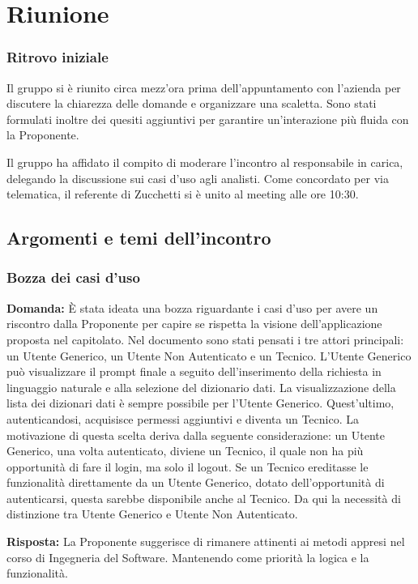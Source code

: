 \section{Riunione}
\subsubsection{Ritrovo iniziale}
Il gruppo si è riunito circa mezz’ora prima dell’appuntamento con l’azienda per discutere la chiarezza delle domande e organizzare una scaletta. Sono stati formulati inoltre dei quesiti aggiuntivi per garantire un’interazione più fluida con la Proponente.

Il gruppo ha affidato il compito di moderare l’incontro al responsabile in carica, delegando la discussione sui casi d’uso agli analisti. Come concordato per via telematica, il referente di Zucchetti si è unito al meeting alle ore 10:30.

\subsection{Argomenti e temi dell'incontro}


\subsubsection{Bozza dei casi d'uso}

\textbf{Domanda:} È stata ideata una bozza riguardante i casi d'uso per avere un riscontro dalla Proponente per capire se rispetta la visione dell’applicazione proposta nel capitolato.
Nel documento sono stati pensati i tre attori principali: un Utente Generico, un Utente Non Autenticato e un Tecnico.
L'Utente Generico può visualizzare il prompt finale a seguito dell'inserimento della richiesta in linguaggio naturale e alla selezione del dizionario dati. La visualizzazione della lista dei dizionari dati è sempre possibile per l'Utente Generico. Quest'ultimo, autenticandosi, acquisisce permessi aggiuntivi e diventa un Tecnico.
La motivazione di questa scelta deriva dalla seguente considerazione: un Utente Generico, una volta autenticato, diviene un Tecnico, il quale non ha più opportunità di fare il login, ma solo il logout. Se un Tecnico ereditasse le funzionalità direttamente da un Utente Generico, dotato dell'opportunità di autenticarsi, questa sarebbe disponibile anche al Tecnico. Da qui la necessità di distinzione tra Utente Generico e Utente Non Autenticato.

\textbf{Risposta:} La Proponente suggerisce di rimanere attinenti ai metodi appresi nel corso di Ingegneria del Software. Mantenendo come priorità la logica e la funzionalità.

